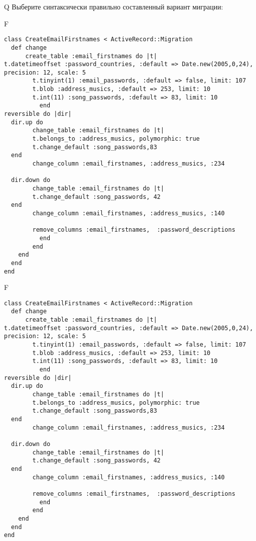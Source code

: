 Q
Выберите синтаксически правильно составленный вариант миграции:

F
\begin{verbatim}
class CreateEmailFirstnames < ActiveRecord::Migration
  def change
	  create_table :email_firstnames do |t|
t.datetimeoffset :password_countries, :default => Date.new(2005,0,24), precision: 12, scale: 5
		t.tinyint(1) :email_passwords, :default => false, limit: 107
		t.blob :address_musics, :default => 253, limit: 10
		t.int(11) :song_passwords, :default => 83, limit: 10
		  end
reversible do |dir|
  dir.up do
		change_table :email_firstnames do |t|
		t.belongs_to :address_musics, polymorphic: true
 		t.change_default :song_passwords,83
  end
 		change_column :email_firstnames, :address_musics, :234
   
  dir.down do
		change_table :email_firstnames do |t|
		t.change_default :song_passwords, 42
  end
 		change_column :email_firstnames, :address_musics, :140
   
		remove_columns :email_firstnames,  :password_descriptions 
	      end
	    end
    end 
  end
end

\end{verbatim}

F
\begin{verbatim}
class CreateEmailFirstnames < ActiveRecord::Migration
  def change
	  create_table :email_firstnames do |t|
t.datetimeoffset :password_countries, :default => Date.new(2005,0,24), precision: 12, scale: 5
		t.tinyint(1) :email_passwords, :default => false, limit: 107
		t.blob :address_musics, :default => 253, limit: 10
		t.int(11) :song_passwords, :default => 83, limit: 10
		  end
reversible do |dir|
  dir.up do
		change_table :email_firstnames do |t|
		t.belongs_to :address_musics, polymorphic: true
 		t.change_default :song_passwords,83
  end
 		change_column :email_firstnames, :address_musics, :234
   
  dir.down do
		change_table :email_firstnames do |t|
		t.change_default :song_passwords, 42
  end
 		change_column :email_firstnames, :address_musics, :140
   
		remove_columns :email_firstnames,  :password_descriptions 
	      end
	    end
    end 
  end
end

\end{verbatim}

